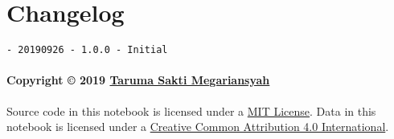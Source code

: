 \documentclass[11pt]{article}
\begin{document}
    \hypertarget{changelog}{%
\section{Changelog}\label{changelog}}

\begin{verbatim}
- 20190926 - 1.0.0 - Initial
\end{verbatim}

\hypertarget{copyright-2019-taruma-sakti-megariansyah}{%
\paragraph{\texorpdfstring{Copyright © 2019
\href{https://taruma.github.io}{Taruma Sakti
Megariansyah}}{Copyright © 2019 Taruma Sakti Megariansyah}}\label{copyright-2019-taruma-sakti-megariansyah}}

Source code in this notebook is licensed under a
\href{https://choosealicense.com/licenses/mit/}{MIT License}. Data in
this notebook is licensed under a
\href{https://creativecommons.org/licenses/by/4.0/}{Creative Common
Attribution 4.0 International}.


    
    
    
\end{document}
